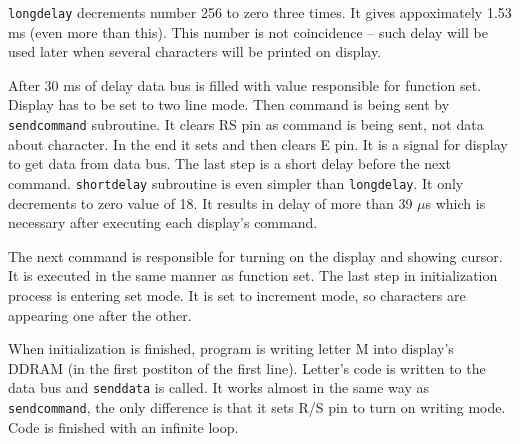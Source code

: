 \documentclass{article}
\begin{document}
\texttt{long\textunderscore delay} decrements number 256 to zero three times. It gives
appoximately 1.53 ms (even more than this). This number is not coincidence -- such delay
will be used later when several characters will be printed on display.

After 30 ms of delay data bus is filled with value responsible for function set. 
Display has to be set to two line mode. Then command is being sent by \texttt{send\textunderscore command}
subroutine. It clears RS pin as command is being sent, not data about character. In the end
it sets and then clears E pin. It is a signal for display to get data from data bus. The last
step is a short delay before the next command. \texttt{short\textunderscore delay} subroutine
is even simpler than \texttt{long\textunderscore delay}. It only decrements to zero value of 18.
It results in delay of more than 39 $\mu$s which is necessary after executing each display's command.

The next command is responsible for turning on the display and showing cursor. It is executed
in the same manner as function set. The last step in initialization process is entering
set mode. It is set to increment mode, so characters are appearing one after the other.

When initialization is finished, program is writing letter M into display's DDRAM (in the first postiton of the first line).
Letter's code is written to the data bus and \texttt{send\textunderscore data} is called.
It works almost in the same way as \texttt{send\textunderscore command}, the only difference is that
it sets R/S pin to turn on writing mode. Code is finished with an infinite loop.
\end{document}
